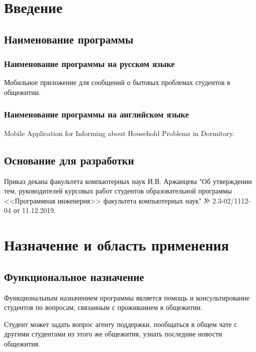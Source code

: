 \documentclass{../includes/TechDoc}
\begin{document}
    \newpage

    \tableofcontents


    \section{Введение}

    \subsection{Наименование программы}

    \subsubsection{Наименование программы на русском языке}

    Мобильное приложение для сообщений о бытовых проблемах студентов в общежитии.

    \subsubsection{Наименование программы на английском языке}

    Mobile Application for Informing about Household Problems in Dormitory.

    \subsection{Основание для разработки}

    Приказ декана факультета компьютерных наук И.В. Аржанцева "Об утверждении тем, руководителей курсовых работ студентов образовательной программы <<Программная инженерия>> факультета компьютерных наук" № 2.3-02/1112-04 от 11.12.2019.


    \section{Назначение и область применения}

    \subsection{Функциональное назначение}

    Функциональным назначением программы является помощь и консультирование студентов по вопросам, связанным
    с проживанием в общежитии.

    Студент может задать вопрос агенту поддержки, пообщаться в общем чате с другими
    студентами из этого же общежития, узнать последние новости общежития.
\end{document}
